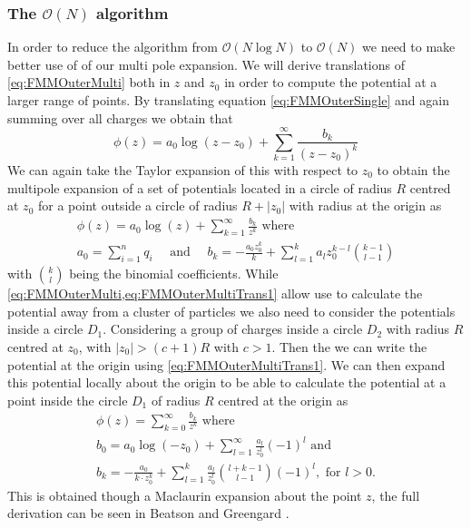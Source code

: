 \subsubsection{\texorpdfstring{The $\mathcal{O}(N)$ algorithm}{The O(N) algorithm}}
In order to reduce the algorithm from $\mathcal{O}(N\log N)$ to $\mathcal{O}(N)$ we need to make better use of of our multi pole expansion. We will derive translations of \cref{eq:FMMOuterMulti} both in $z$ and $z_0$ in order to compute the potential at a larger range of points.
By translating equation \cref{eq:FMMOuterSingle} and again summing over all charges we obtain that
\begin{equation}
\label{eq:FMMOuterMultiTrans1}
    \phi(z) = a_0\log(z-z_0) + \sum_{k=1}^\infty \frac{b_k}{(z-z_0)^k}
\end{equation}
We can again take the Taylor expansion of this with respect to $z_0$ to obtain the multipole expansion of a set of potentials located in a circle of radius $R$ centred at $z_0$ for a point outside a circle of radius $R+|z_0|$ with radius at the origin as 
\begin{equation}
\label{eq:FMMOuterMultiTrans2}
\begin{gathered}
    \phi(z) = a_0\log(z) + \sum_{k=1}^\infty \frac{b_k}{z^k} \text{ where } \\
    a_0 = \sum_{i=1}^n q_i \quad \text{ and } \quad b_k = -\frac{a_0 z_0^k}{k} + \sum_{l=1}^{k} a_l z_0^{k-l} \binom{k-1}{l-1}
\end{gathered}
\end{equation}
with $\binom{k}{l}$ being the binomial coefficients. While \cref{eq:FMMOuterMulti,eq:FMMOuterMultiTrans1} allow use to calculate the potential away from a cluster of particles we also need to consider the potentials inside a circle $D_1$. Considering a group of charges inside a circle $D_2$ with radius $R$ centred at $z_0$, with $|z_0|>(c+1)R$ with $c>1$. Then the we can write the potential at the origin using \cref{eq:FMMOuterMultiTrans1}. We can then expand this potential locally about the origin to be able to calculate the potential at a point inside the circle $D_1$ of radius $R$ centred at the origin as
\begin{equation}
\label{eq:FMMInner}
\begin{gathered}
    \phi(z) = \sum_{k=0}^\infty \frac{b_k}{z^k} \text{ where } \\
    b_0 = a_0\log(-z_0) + \sum_{l=1}^\infty \frac{a_l}{z_0^l}(-1)^l \text{ and } \\
    b_k = -\frac{a_0}{k\cdot z_0^k} + \sum_{l=1}^{k} \frac{a_l}{z_0^{l}} \binom{l+k-1}{l-1}(-1)^l, \text{ for } l>0.
\end{gathered}
\end{equation}
This is obtained though a Maclaurin expansion about the point $z$, the full derivation can be seen in Beatson and Greengard \cite{Beatson}. 

